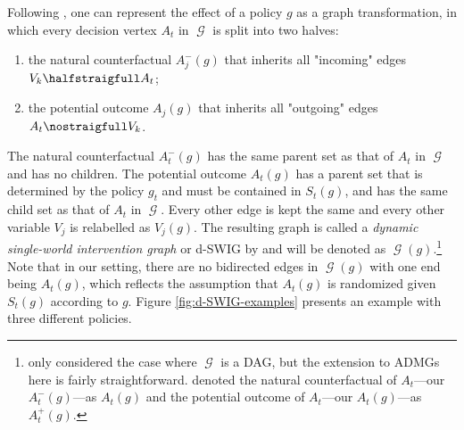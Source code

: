 \documentclass[12pt,a4paper]{article}
\theoremstyle{definition}
\newcommand{\indep}{\perp \!\!\! \perp}
\newcommand{\ingraph}[1]{~\textnormal{\bf in}\,#1}
\DeclareMathOperator{\gG}{\mathscr{G}}
\DeclareMathOperator{\sJ}{\mathcal{J}}
\DeclareMathOperator{\sK}{\mathcal{K}}
\begin{document}



Following \textcite{richardson_single_2013}, one can represent
the effect of a policy $g$ as a graph transformation, in which every
decision vertex $A_t$ in $\gG$ is split into two halves:
\begin{enumerate}
    \item the natural counterfactual $A_j^-(g)$ that inherits all "incoming" edges $V_k \halfstraigfull A_t$;
    \item the potential outcome $A_j(g)$ that inherits all "outgoing" edges $A_t \nostraigfull V_k$.
\end{enumerate}
The natural counterfactual $A_t^-(g)$ has the same parent set as that
of $A_t$ in $\gG$ and has no children.
The potential outcome $A_t(g)$ has a parent set that is determined by the
policy $g_t$ and must be contained in $S_t(g)$, and has the same child
set as that of $A_t$ in $\gG$. Every other edge is kept the same and
every other variable $V_j$ is relabelled as $V_j(g)$. The resulting
graph is called a \emph{dynamic single-world intervention graph} or
d-SWIG by \textcite[Section 5]{richardson_single_2013} and
will be denoted as
$\gG(g)$.\footnote{\textcite[Section 5]{richardson_single_2013} only
  considered the case where $\gG$ is a DAG, but the extension to ADMGs
  here is fairly
  straightforward. \textcite{richardson_single_2013} denoted the
  natural counterfactual of $A_t$---our $A_t^-(g)$---as $A_t(g)$ and
  the potential outcome of $A_t$---our $A_t(g)$---as
  $A_t^+(g)$.} Note that in our setting, there
are no bidirected edges in $\gG(g)$ with one end being $A_t(g)$, which
reflects the assumption that $A_t(g)$ is randomized given $S_t(g)$
according to $g$. Figure \ref{fig:d-SWIG-examples} presents an example
with three different policies.
\end{document}
